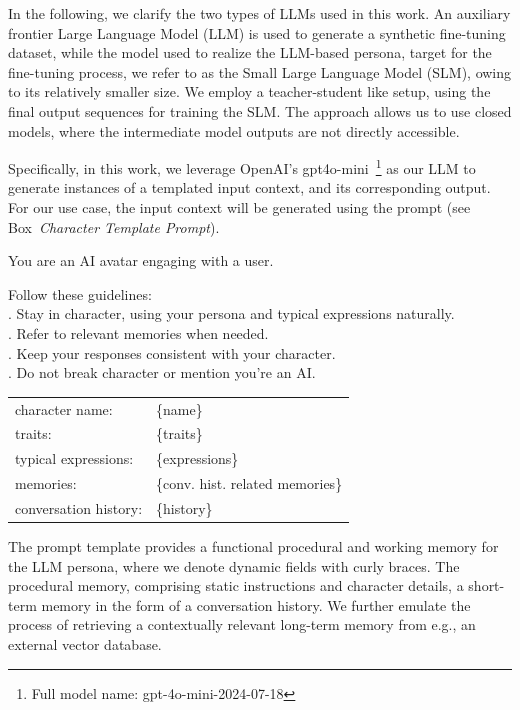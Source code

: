 \documentclass[letterpaper]{article}
\newcommand{\allm}{OpenAI's gpt4o-mini}  %
\newcommand{\fullallm}{gpt-4o-mini-2024-07-18}
\begin{document}
In the following, we clarify the two types of LLMs used in this work. An auxiliary frontier Large Language Model (LLM) is used to generate a synthetic fine-tuning dataset, while the model used to realize the LLM-based persona, target for the fine-tuning process, we refer to as the Small Large Language Model (SLM), owing to its relatively smaller size. We employ a teacher-student like setup, using the final output sequences for training the SLM. The approach allows us to use closed models, where the intermediate model outputs are not directly accessible.

Specifically, in this work, we leverage \allm~\footnote{Full model name: \fullallm} as our LLM to generate instances of a templated input context, and its corresponding output. For our use case, the input context will be generated using the prompt (see Box~\textit{Character Template Prompt}).

\begin{center}
\begin{tcolorbox}[colback=gray!10, colframe=gray!80, width=0.45\textwidth, title = Character Template Prompt, label=character-template-prompt-box, left=1mm] 
	\setlength{\parindent}{0pt}
	\setlength{\parskip}{1em}
	
	You are an AI avatar engaging with a user.
	
	Follow these guidelines:	\\
	. Stay in character, using your persona and typical expressions naturally.\\
	. Refer to relevant memories when needed.\\
	. Keep your responses consistent with your character.\\
	. Do not break character or mention you're an AI.
	
	\begin{tabular}{@{}ll@{}}
		character name: & \{name\} \\[0.2em]
		traits: & \{traits\} \\[0.2em]
		typical expressions: & \{expressions\} \\[0.2em]
		memories: & \{conv. hist. related memories\} \\[0.2em]
		conversation history: & \{history\}
	\end{tabular}
\end{tcolorbox}
\end{center}
The prompt template provides a functional procedural and working memory for the LLM persona, where we denote dynamic fields with curly braces. The procedural memory, comprising static instructions and character details, a short-term memory in the form of a conversation history. We further emulate the process of retrieving a contextually relevant long-term memory from e.g., an external vector database.~\cite{sumers2023cognitive}
\end{document}
